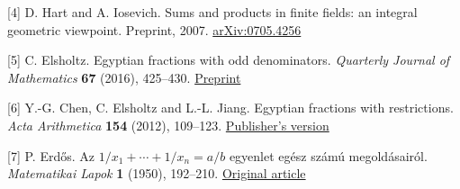 \documentclass[11pt,a4paper]{article}
\begin{document}
\noindent\hypertarget{ref-4}{[4]} D. Hart and A. Iosevich. Sums and products in finite fields: an integral geometric viewpoint. Preprint, 2007. \href{https://arxiv.org/abs/0705.4256}{arXiv:0705.4256}\par\smallskip

\noindent\hypertarget{ref-5}{[5]} C. Elsholtz. Egyptian fractions with odd denominators. \emph{Quarterly Journal of Mathematics} \textbf{67} (2016), 425–430. \href{https://arxiv.org/abs/1606.02117}{Preprint}\par\smallskip

\noindent\hypertarget{ref-6}{[6]} Y.-G. Chen, C. Elsholtz and L.-L. Jiang. Egyptian fractions with restrictions. \emph{Acta Arithmetica} \textbf{154} (2012), 109–123. \href{https://doi.org/10.4064/aa154-2-1}{Publisher's version}\par\smallskip

\noindent\hypertarget{ref-7}{[7]} P. Erdős. Az $1/x_1+\cdots+1/x_n=a/b$ egyenlet egész számú megoldásairól. \emph{Matematikai Lapok} \textbf{1} (1950), 192–210. \href{https://www.renyi.hu/~p_erdos/1950-02.pdf}{Original article}\par\smallskip
\end{document}

